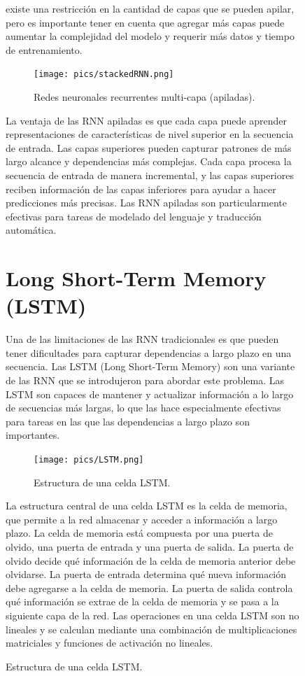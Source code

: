 \documentclass{book}
\begin{document}
\begin{figure}[h]
{existe una restricción en la cantidad de capas que se pueden apilar, pero es importante tener en cuenta que agregar más capas puede aumentar la complejidad del modelo y requerir más datos y tiempo de entrenamiento.

\begin{figure}[h]
  \centering
  \texttt{[image: pics/stackedRNN.png]}
  \caption{Redes neuronales recurrentes multi-capa (apiladas).}
\end{figure}

La ventaja de las RNN apiladas es que cada capa puede aprender representaciones de características de nivel superior en la secuencia de entrada. Las capas superiores pueden capturar patrones de más largo alcance y dependencias más complejas. Cada capa procesa la secuencia de entrada de manera incremental, y las capas superiores reciben información de las capas inferiores para ayudar a hacer predicciones más precisas. Las RNN apiladas son particularmente efectivas para tareas de modelado del lenguaje y traducción automática.

\section{Long Short-Term Memory (LSTM)}

Una de las limitaciones de las RNN tradicionales es que pueden tener dificultades para capturar dependencias a largo plazo en una secuencia. Las LSTM (Long Short-Term Memory) son una variante de las RNN que se introdujeron para abordar este problema. Las LSTM son capaces de mantener y actualizar información a lo largo de secuencias más largas, lo que las hace especialmente efectivas para tareas en las que las dependencias a largo plazo son importantes.

\begin{figure}[h]
  \centering
  \texttt{[image: pics/LSTM.png]}
  \caption{Estructura de una celda LSTM.}
\end{figure}

La estructura central de una celda LSTM es la celda de memoria, que permite a la red almacenar y acceder a información a largo plazo. La celda de memoria está compuesta por una puerta de olvido, una puerta de entrada y una puerta de salida. La puerta de olvido decide qué información de la celda de memoria anterior debe olvidarse. La puerta de entrada determina qué nueva información debe agregarse a la celda de memoria. La puerta de salida controla qué información se extrae de la celda de memoria y se pasa a la siguiente capa de la red. Las operaciones en una celda LSTM son no lineales y se calculan mediante una combinación de multiplicaciones matriciales y funciones de activación no lineales.

}
\end{figure}
\end{document}
